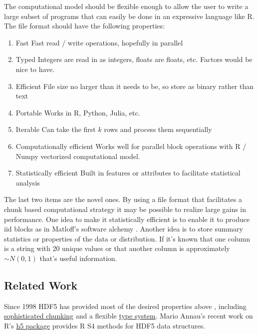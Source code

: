 \documentclass[12pt]{article}
\begin{document}
The computational model should be flexible enough to allow the user to
write a large subset of programs that can easily be done in an expressive
language like R.  The file format should have the following properties:

\begin{enumerate}
    \item{Fast} Fast read / write operations, hopefully in parallel
    \item{Typed} Integers are read in as integers, floats are floats, etc.
        Factors would be nice to have.
    \item{Efficient} File size no larger than it needs to be, so store as
        binary rather than text
    \item{Portable} Works in R, Python, Julia, etc.
    \item{Iterable} Can take the first $k$ rows and process them
        sequentially
    \item{Computationally efficient} Works well for parallel block
        operations with R / Numpy vectorized computational model.
    \item{Statistically efficient} Built in features or attributes to
        facilitate statistical analysis
\end{enumerate}

The last two items are the novel ones. By using a file format
that facilitates a chunk based computational strategy it may be possible to
realize large gains in performance. One idea to make it statistically
efficient is to enable it to produce iid blocks as in Matloff's software
alchemy \cite{matloff2014software}. Another idea is to store summary
statistics or properties of the data or distribution. If it's known that
one column is a string with 20 unique values or that another column is
approximately $\sim N(0, 1)$ that's useful information. 

\subsection{Related Work}

Since 1998 HDF5 has provided most of the desired properties above
\cite{hdf5}, including
\href{https://support.hdfgroup.org/HDF5/doc/Advanced/Chunking/}{sophisticated
chunking} and a flexible
\href{https://support.hdfgroup.org/HDF5/doc1.6/UG/11_Datatypes.html}{type system}.
Mario Annau's recent work on R's \href{https://github.com/mannau/h5}{h5
package} provides R S4 methods for HDF5 data structures.
\end{document}

